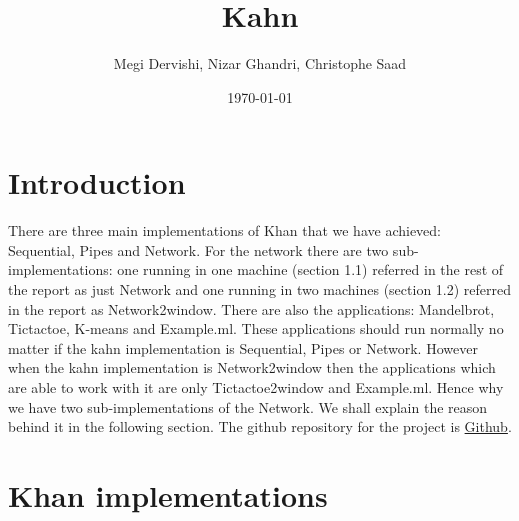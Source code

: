 \documentclass[10pt,a4paper]{article}
\title{Kahn}
\author{Megi Dervishi, Nizar Ghandri, Christophe Saad}
\date{\today}
\begin{document}
\maketitle
\section{Introduction}
There are three main implementations of Khan that we have achieved: Sequential, Pipes and Network. For the network there are two sub-implementations: one running in one machine (section 1.1) referred in the rest of the report as just Network and one running in two machines (section 1.2) referred in the report as Network2window. There are also the applications: Mandelbrot, Tictactoe, K-means and Example.ml. These applications should run normally no matter if the kahn implementation is Sequential, Pipes or Network. However when the kahn implementation is Network2window then the applications which are able to work with it are only Tictactoe2window and Example.ml. Hence why we have two sub-implementations of the Network. We shall explain the reason behind it in the following section. The github repository for the project is \href{https://github.com/xopheS/kpn}{\color{blue}Github}.

\section{Khan implementations }
\end{document}
